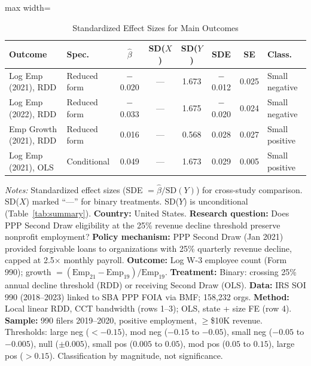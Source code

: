 \begin{table}[H]
\centering
\caption{Standardized Effect Sizes for Main Outcomes}
\label{tab:sde}
\begin{minipage}{\textwidth}
\centering
\begin{adjustbox}{max width=\textwidth}
\footnotesize
\begin{tabular}{llcccccl}
\toprule
Outcome & Spec. & $\hat{\beta}$ & SD($X$) & SD($Y$) & SDE & SE & Class. \\
\midrule
Log Emp (2021), RDD & Reduced form & $-$0.020 & --- & 1.673 & $-$0.012 & 0.025 & Small negative \\
Log Emp (2022), RDD & Reduced form & $-$0.033 & --- & 1.675 & $-$0.020 & 0.024 & Small negative \\
Emp Growth (2021), RDD & Reduced form & 0.016 & --- & 0.568 & 0.028 & 0.027 & Small positive \\
Log Emp (2021), OLS & Conditional & 0.049 & --- & 1.673 & 0.029 & 0.005 & Small positive \\
\bottomrule
\end{tabular}
\end{adjustbox}

\vspace{0.5em}
\scriptsize
\textit{Notes:} Standardized effect sizes (SDE $= \hat{\beta}/\text{SD}(Y)$) for cross-study comparison. SD($X$) marked ``---'' for binary treatments. SD($Y$) is unconditional (Table~\ref{tab:summary}).
\textbf{Country:} United States.
\textbf{Research question:} Does PPP Second Draw eligibility at the 25\% revenue decline threshold preserve nonprofit employment?
\textbf{Policy mechanism:} PPP Second Draw (Jan 2021) provided forgivable loans to organizations with 25\% quarterly revenue decline, capped at 2.5$\times$ monthly payroll.
\textbf{Outcome:} Log W-3 employee count (Form 990); growth $= (\text{Emp}_{21} - \text{Emp}_{19})/\text{Emp}_{19}$.
\textbf{Treatment:} Binary: crossing 25\% annual decline threshold (RDD) or receiving Second Draw (OLS).
\textbf{Data:} IRS SOI 990 (2018--2023) linked to SBA PPP FOIA via BMF; 158,232 orgs.
\textbf{Method:} Local linear RDD, CCT bandwidth (rows 1--3); OLS, state + size FE (row 4).
\textbf{Sample:} 990 filers 2019--2020, positive employment, $\geq$\$10K revenue.
Thresholds: large neg ($<-0.15$), mod neg ($-0.15$ to $-0.05$), small neg ($-0.05$ to $-0.005$), null ($\pm 0.005$), small pos ($0.005$ to $0.05$), mod pos ($0.05$ to $0.15$), large pos ($>0.15$). Classification by magnitude, not significance.
\end{minipage}
\end{table}
